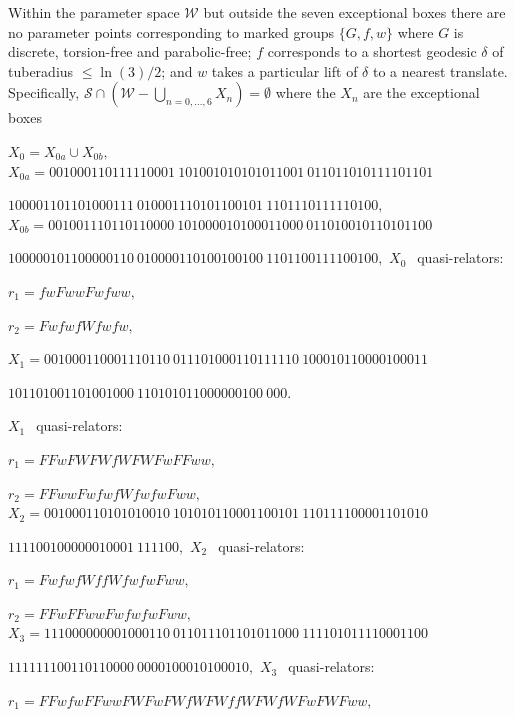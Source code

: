 \begin{proposition}\label{GMT 1.28}  
Within the parameter space ${\mathcal W}$ but outside the seven exceptional boxes there are no parameter points corresponding to 
marked groups $\{G,f,w\}$ where $G$ is 
discrete{\textrm ,} torsion\/{\textrm -}\/free and  parabolic\/{\textrm -}\/free\/{\textrm ;}
$f$ corresponds to a shortest geodesic $\delta$ of tuberadius $\le
\ln(3)/2${\textrm ;} and $w$ takes a particular lift of $\delta$ to 
a nearest translate.
 Specifically{\textrm ,} 
${\mathcal S} \cap ({\mathcal W} - \bigcup_{n = 0,\dots, 6} X_n)=\emptyset$ where the $X_n$ are the exceptional boxes


 \noindent $X_0 = X_{0a} \cup X_{0b},$
\noindent $X_{0a} = 
001000110111110001\ 
101001010101011001\ 
011011010111101101$\hfill 

 
 \hfill
$100001101101000111\ 
010001110101100101\ 
1101110111110100,$  
 \noindent $X_{0b} = 
001001110110110000\ 
101000010100011000\ 
011010010110101100$

\hfill
$100000101100000110\ 
010000110100100100\ 
1101100111100100,$ 
 \vglue4pt
\noindent  $X_0\ \ $ quasi\/{\textrm -}\/relators\/{\textrm :}

$r_1 = fwFwwFwfww,$
 
$r_2 = FwfwfWfwfw,$

\vglue8pt
\noindent $X_1 = 
001000110001110110\ 
011101000110111110\ 
100010110000100011$\hfill 

\hfill $
101101001101001000\ 
110101011000000100\ 
000.$ 

\noindent $X_1\ \ 
$ quasi\/{\textrm -}\/relators\/{\textrm :}

$r_1 = FFwFWFWfWFWFwFFww,$
 
$r_2 = FFwwFwfwfWfwfwFww,$
\vglue4pt
\noindent $X_2 = 
001000110101010010\ 
101010110001100101\ 
110111100001101010$\hfill

\hfill $111100100000010001\ 
111100,$
\noindent $X_2\ \ $ quasi\/{\textrm -}\/relators\/{\textrm :}

$r_1 = FwfwfWffWfwfwFww,$

$r_2 = FFwFFwwFwfwfwFww,$
\noindent 
$X_3 = 
111000000001000110\ 
011011101101011000\ 
111101011110001100$\hfill

\hfill  
$111111100110110000\ 
0000100010100010,$
\noindent $X_3\ \ $ quasi\/{\textrm -}\/relators\/{\textrm :}\/

$r_1 = FFwfwFFwwFWFwFWfWFWffWFWfWFwFWFww,$ 


\end{proposition}
